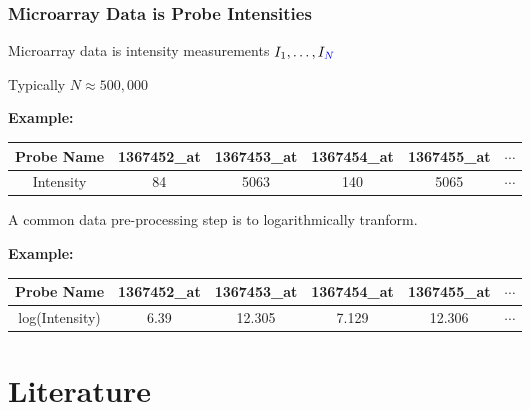\documentclass{beamer}
\begin{document}
\begin{frame}
\frametitle{Microarray Data is Probe Intensities}
Microarray data is intensity measurements $I_1,\ldots,I_{\color{blue}N}$\vspace{.1cm}

Typically {\color{blue}$N\approx 500,000$}


{\small \begin{center}
    {\bf Example:}
    \begin{tabular}{c||c|c|c|c|c}
      Probe Name& 1367452\_at& 1367453\_at& 1367454\_at& 1367455\_at& $\cdots$\\\hline
      Intensity& 84&       5063&        140&       5065&        $\cdots$
    \end{tabular}
  \end{center}}

  A common data pre-processing step is to {\color{blue}logarithmically} tranform.

  {\small \begin{center}
          {\bf Example:}
    \begin{tabular}{c||c|c|c|c|c}
      Probe Name& 1367452\_at& 1367453\_at& 1367454\_at& 1367455\_at& $\cdots$\\\hline
      log(Intensity)& 6.39&       12.305&       7.129&       12.306&        $\cdots$
    \end{tabular}
  \end{center}}
\end{frame}

\setcounter{subsection}{0}
\section{Literature}
\subsection{}

\begin{frame}
  \frametitle{}
  \begin{center}
  {\color{blue}{\Huge
    Literature Review
  }}
  \end{center}
\end{frame}
\end{document}
